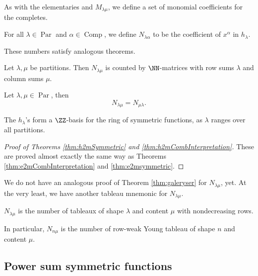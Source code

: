 \documentclass{article}
\DeclareMathOperator{\Par}{Par}
\DeclareMathOperator{\Com}{Comp}
\begin{document}
As with the elementaries and $M_{\lambda\mu}$, we define a set of monomial coefficients for the completes.

\begin{definition}
    For all $\lambda \in \Par$ and $\alpha \in \Com$, we define $N_{\lambda\alpha}$ to be the coefficient of $x^\alpha$ in $h_\lambda$.
\end{definition}

These numbers satisfy analogous theorems.

\begin{theorem} \label{thm:h2mCombInterpretation}
    Let $\lambda, \mu$ be partitions. Then $N_{\lambda\mu}$ is counted by $\NN$-matrices with row sums $\lambda$ and column sums $\mu$.
\end{theorem}

\begin{theorem} \label{thm:h2mSymmetric}
    Let $\lambda, \mu \in \Par$, then
    \[
        N_{\lambda\mu} = N_{\mu\lambda}.
    \]
\end{theorem}

\begin{theorem}
    \label{thm:hAreBasis}
    The $h_\lambda$'s form a $\ZZ$-basis for the ring of symmetric functions, as $\lambda$ ranges over all partitions.
\end{theorem}

\begin{proof}[Proof of Theorems \ref{thm:h2mSymmetric} and \ref{thm:h2mCombInterpretation}]
    These are proved almost exactly the same way as Theorems \ref{thm:e2mCombInterpretation} and \ref{thm:e2msymmetric}.
\end{proof}

We do not have an analogous proof of Theorem \ref{thm:galeryser} for $N_{\lambda\mu}$, yet.
At the very least, we have another tableau mnemonic for $N_{\lambda\mu}$.

\begin{theorem}
    $N_{\lambda\mu}$ is the number of tableaux of shape $\lambda$ and content $\mu$ with nondecreasing rows. 

    In particular, $N_{n\mu}$ is the number of row-weak Young tableau of shape $n$ and content $\mu$.
\end{theorem}

\subsection{Power sum symmetric functions}
\end{document}
